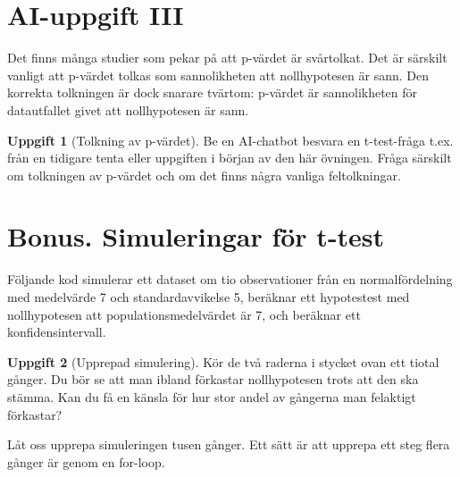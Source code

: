 \documentclass[
]{book}
\newenvironment{Shaded}{\begin{snugshade}}{\end{snugshade}}
\newcommand{\AttributeTok}[1]{\textcolor[rgb]{0.13,0.29,0.53}{#1}}
\newcommand{\DecValTok}[1]{\textcolor[rgb]{0.00,0.00,0.81}{#1}}
\newcommand{\FunctionTok}[1]{\textcolor[rgb]{0.13,0.29,0.53}{\textbf{#1}}}
\newcommand{\NormalTok}[1]{#1}
\newcommand{\OtherTok}[1]{\textcolor[rgb]{0.56,0.35,0.01}{#1}}
\newcommand{\SpecialCharTok}[1]{\textcolor[rgb]{0.81,0.36,0.00}{\textbf{#1}}}
\theoremstyle{definition}
\theoremstyle{definition}
\theoremstyle{definition}
\newtheorem{exercise}{Uppgift}[chapter]
\theoremstyle{definition}
\theoremstyle{remark}
\begin{document}
\section{AI-uppgift III}\label{ai-uppgift-iii}

Det finns många studier som pekar på att p-värdet är svårtolkat. Det är särskilt vanligt att p-värdet tolkas som sannolikheten att nollhypotesen är sann. Den korrekta tolkningen är dock snarare tvärtom: p-värdet är sannolikheten för datautfallet givet att nollhypotesen är sann.

\begin{exercise}[Tolkning av p-värdet]
Be en AI-chatbot besvara en t-test-fråga t.ex. från en tidigare tenta eller uppgiften i början av den här övningen. Fråga särskilt om tolkningen av p-värdet och om det finns några vanliga feltolkningar.
\end{exercise}

\section{Bonus. Simuleringar för t-test}\label{bonus.-simuleringar-fuxf6r-t-test}

Följande kod simulerar ett dataset om tio observationer från en normalfördelning med medelvärde 7 och standardavvikelse 5, beräknar ett hypotestest med nollhypotesen att populationsmedelvärdet är 7, och beräknar ett konfidensintervall.

\begin{Shaded}
\end{Shaded}

\begin{exercise}[Upprepad simulering]
Kör de två raderna i stycket ovan ett tiotal gånger. Du bör se att man ibland förkastar nollhypotesen trots att den ska stämma. Kan du få en känsla för hur stor andel av gångerna man felaktigt förkastar?
\end{exercise}

Låt oss upprepa simuleringen tusen gånger. Ett sätt är att upprepa ett steg flera gånger är genom en for-loop.
\end{document}
